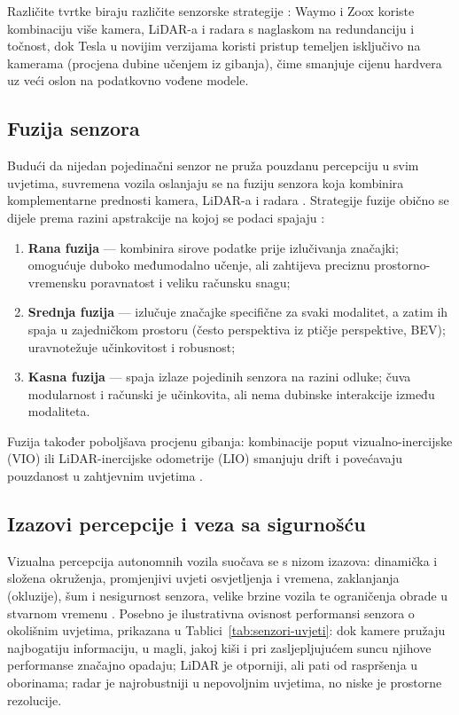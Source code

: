 Različite tvrtke biraju različite senzorske strategije \cite{suligoj2025percepcija1}: Waymo i Zoox koriste kombinaciju više kamera, LiDAR-a i radara s naglaskom na redundanciju i točnost, dok Tesla u novijim verzijama koristi pristup temeljen isključivo na kamerama (procjena dubine učenjem iz gibanja), čime smanjuje cijenu hardvera uz veći oslon na podatkovno vođene modele.

\subsection{Fuzija senzora}

Budući da nijedan pojedinačni senzor ne pruža pouzdanu percepciju u svim uvjetima, suvremena vozila oslanjaju se na fuziju senzora koja kombinira komplementarne prednosti kamera, LiDAR-a i radara \cite{suligoj2025percepcija1}. Strategije fuzije obično se dijele prema razini apstrakcije na kojoj se podaci spajaju \cite{suligoj2025percepcija2}:
\begin{enumerate}
  \item \textbf{Rana fuzija} — kombinira sirove podatke prije izlučivanja značajki; omogućuje duboko međumodalno učenje, ali zahtijeva preciznu prostorno-vremensku poravnatost i veliku računsku snagu;
  \item \textbf{Srednja fuzija} — izlučuje značajke specifične za svaki modalitet, a zatim ih spaja u zajedničkom prostoru (često perspektiva iz ptičje perspektive, BEV); uravnotežuje učinkovitost i robusnost;
  \item \textbf{Kasna fuzija} — spaja izlaze pojedinih senzora na razini odluke; čuva modularnost i računski je učinkovita, ali nema dubinske interakcije između modaliteta.
\end{enumerate}
Fuzija također poboljšava procjenu gibanja: kombinacije poput vizualno-inercijske (VIO) ili LiDAR-inercijske odometrije (LIO) smanjuju drift i povećavaju pouzdanost u zahtjevnim uvjetima \cite{suligoj2025percepcija1}.

\subsection{Izazovi percepcije i veza sa sigurnošću}

Vizualna percepcija autonomnih vozila suočava se s nizom izazova: dinamička i složena okruženja, promjenjivi uvjeti osvjetljenja i vremena, zaklanjanja (okluzije), šum i nesigurnost senzora, velike brzine vozila te ograničenja obrade u stvarnom vremenu \cite{suligoj2025percepcija1}. Posebno je ilustrativna ovisnost performansi senzora o okolišnim uvjetima, prikazana u Tablici~\ref{tab:senzori-uvjeti}: dok kamere pružaju najbogatiju informaciju, u magli, jakoj kiši i pri zasljepljujućem suncu njihove performanse značajno opadaju; LiDAR je otporniji, ali pati od raspršenja u oborinama; radar je najrobustniji u nepovoljnim uvjetima, no niske je prostorne rezolucije.

